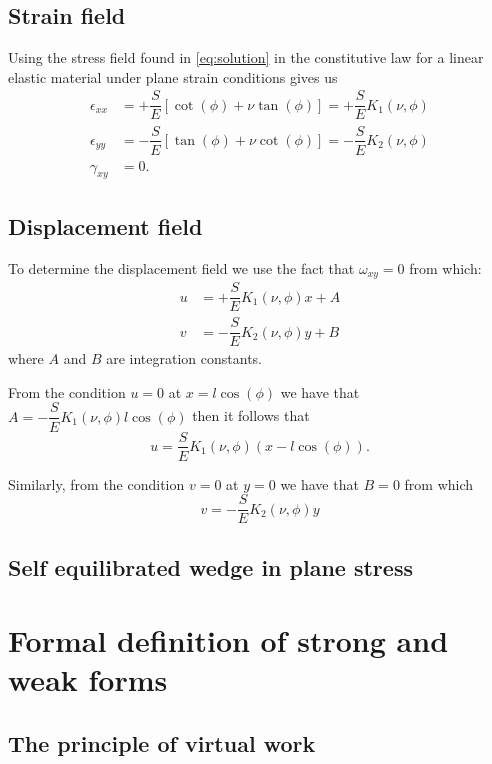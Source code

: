 \subsection*{Strain field}
Using the stress field found in \cref{eq:solution} in the constitutive law for a linear elastic material under plane strain conditions gives us
\begin{equation}
\begin{aligned}
\epsilon_{xx}& = +\dfrac{S}{E}\left[\cot(\phi)+\nu \tan(\phi)\right] = +\dfrac{S}{E}K_{1}(\nu , \phi)\\
\epsilon_{yy}& = -\dfrac{S}{E}\left[\tan(\phi)+\nu \cot(\phi)\right] = -\dfrac{S}{E}K_{2}(\nu , \phi)\\
\gamma_{xy}& = 0.
\end{aligned}
\label{eq:strain part}
\end{equation}

\subsection*{Displacement field}

To determine the displacement field we use the fact that $\omega_{xy}=0$ from which:
\begin{align*}
u &= +\dfrac{S}{E} K_{1}(\nu , \phi)x + A\\
v &= -\dfrac{S}{E} K_{2}(\nu , \phi)y + B
\end{align*}
where $A$ and $B$ are integration constants.

From the condition $u=0$ at $x=l\cos(\phi)$ we have that $A=-\dfrac{S}{E} K_{1}(\nu , \phi)l\cos(\phi)$ then it follows that
\[u=\dfrac{S}{E} K_{1}(\nu , \phi)(x-l\cos(\phi)).\]

Similarly, from the condition $v=0$ at $y=0$ we have that $B=0$ from which
\[v=-\dfrac{S}{E} K_{2}(\nu , \phi)y\]



\subsection*{Self equilibrated wedge in plane stress}

\section{Formal definition of strong and weak forms}

\subsection{The principle of virtual work}

